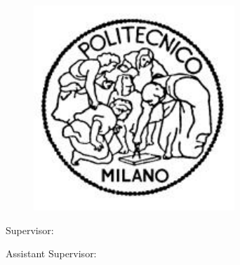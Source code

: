 \begin{titlepage}
    \begin{center}
    	\large
        \spacedlowsmallcaps{\myUni} \\
        \bigskip\myFaculty \\
    	\medskip\myDepartment \\
    	\bigskip\myCourseFirstPart \\
        \medskip\myCourseSecondPart \\  

        \hfill

        \vfill
        
        \begin{figure}[!h]
			\begin{center}
				\includegraphics[width=0.3\columnwidth]{Images/logoPoli.pdf} 
			\end{center}
		\end{figure}
		
		\vfill

        \begingroup
       		\huge	
            \color{Maroon} \myTitle
            \bigskip
        \endgroup

        \vfill

		\flushleft 
		\normalsize{Supervisor:}\\
		\medskip\spacedlowsmallcaps{\mySupervisor}

		\flushleft
		\normalsize{Assistant Supervisor:}\\
		\medskip\spacedlowsmallcaps{\myOtherSupervisor}\\
        

\end{center}
\end{titlepage}
